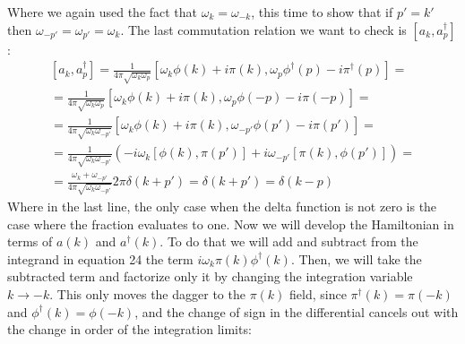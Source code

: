 \documentclass{article}
\begin{document}
Where we again used the fact that $\omega_k = \omega_{-k}$, this time to show that if $p' = k'$ then $\omega_{-p'} = \omega_{p'} = \omega_{k}$. The last commutation relation we want to check is $\left[a_k, a^\dagger_p\right]$:
\begin{equation}
\begin{gathered}
    \left[a_k, a_p^\dagger\right] = \frac{1}{4\pi \sqrt{\omega_k\omega_p}}
    \left[
        \omega_k\phi(k) + i\pi(k),
        \omega_p\phi^\dagger(p) - i\pi^\dagger(p)
    \right] = \\
     = \frac{1}{4\pi \sqrt{\omega_k\omega_p}}
    \left[
        \omega_k\phi(k) + i\pi(k),
        \omega_p\phi(-p) - i\pi(-p)
    \right] = \\
     = \frac{1}{4\pi \sqrt{\omega_k\omega_{-p'}}}
    \left[
        \omega_k\phi(k) + i\pi(k),
        \omega_{-p'}\phi(p') - i\pi(p')
    \right] = \\
     = \frac{1}{4\pi \sqrt{\omega_k\omega_{-p'}}}
    \left(
        - i\omega_k\left[\phi(k),\pi(p')\right]
        + i\omega_{-p'}\left[\pi(k),\phi(p')\right]
    \right) = \\
     = \frac{\omega_k + \omega_{-p'}}{4\pi \sqrt{\omega_k\omega_{-p'}}}
    2\pi \delta(k+p') = \delta(k + p') = \delta(k - p)
\end{gathered}
\end{equation}
Where in the last line, the only case when the delta function is not zero is the case where the fraction evaluates to one.
\newline
Now we will develop the Hamiltonian in terms of $a(k)$ and $a^\dagger(k)$.
To do that we will add and subtract from the integrand in equation 24 the term $i\omega_k\pi(k)\phi^\dagger(k)$. Then, we will take the subtracted term and factorize only it by changing the integration variable $k \rightarrow -k$. This only moves the dagger to the $\pi(k)$ field, since $\pi^\dagger(k) = \pi(-k)$ and $\phi^\dagger(k) = \phi(-k)$, and the change of sign in the differential cancels out with the change in order of the integration limits:
\end{document}
